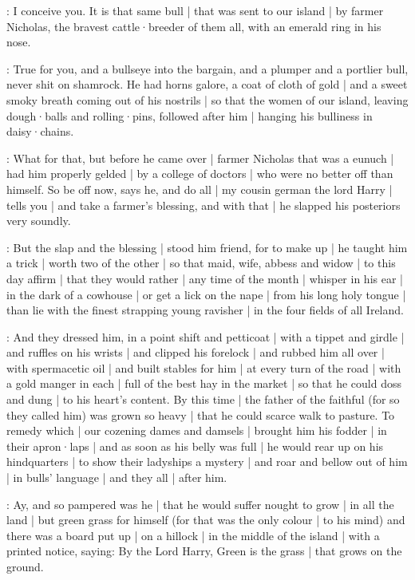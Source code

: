 \dixon:
I conceive you.
It is that same bull |
that was sent to our island |
by farmer Nicholas,
the bravest cattle·breeder of them all,
with an emerald ring in his nose.

\lynch:
True for you,
and a bullseye into the bargain,
and a plumper and a portlier bull,
never shit on shamrock.
He had horns galore,
a coat of cloth of gold |
and a sweet smoky breath coming out of his nostrils |
so that the women of our island,
leaving dough·balls and rolling·pins,
followed after him |
hanging his bulliness in daisy·chains.

\dixon:
What for that,
but before he came over |
farmer Nicholas that was a eunuch |
had him properly gelded |
by a college of doctors |
who were no better off than himself.
So be off now,
says he,
and do all |
my cousin german the lord Harry |
tells you |
and take a farmer's blessing,
and with that |
he slapped his posteriors very soundly.

\lynch:
But the slap and the blessing |
stood him friend,
for to make up |
he taught him a trick |
worth two of the other |
so that maid,
wife,
abbess and widow |
to this day affirm |
that they would rather |
any time of the month |
whisper in his ear |
in the dark of a cowhouse |
or get a lick on the nape |
from his long holy tongue |
than lie with the finest strapping young ravisher |
in the four fields of all Ireland.

\madden:
And they dressed him,
in a point shift and petticoat |
with a tippet and girdle |
and ruffles on his wrists |
and clipped his forelock |
and rubbed him all over |
with spermacetic oil |
and built stables for him |
at every turn of the road |
with a gold manger in each |
full of the best hay in the market |
so that he could doss and dung |
to his heart's content.
By this time |
the father of the faithful
(for so they called him)
was grown so heavy |
that he could scarce walk to pasture.
To remedy which |
our cozening dames and damsels |
brought him his fodder |
in their apron·laps |
and as soon as his belly was full |
he would rear up on his hindquarters |
to show their ladyships a mystery |
and roar and bellow out of him |
in bulls' language |
and they all |
after him.

\lenehan:
Ay,
and so pampered was he |
that he would suffer nought to grow |
in all the land |
but green grass for himself
(for that was the only colour |
to his mind)
and there was a board put up |
on a hillock |
in the middle of the island |
with a printed notice,
saying:
By the Lord Harry,
Green is the grass |
that grows on the ground.

